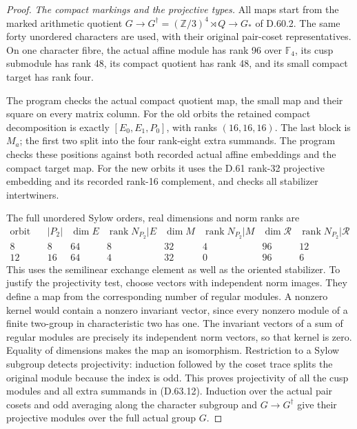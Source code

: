 \begin{proof}
\emph{The compact markings and the projective types.}
All maps start from the marked arithmetic quotient
\(G\to G^\dagger=(\mathbb Z/3)^4\rtimes Q\to G_*\)
of D.60.2. The same forty unordered characters are
used, with their original pair-coset representatives.
On one character fibre, the actual affine module has
rank 96 over \(\mathbb F_4\), its cusp submodule has
rank 48, its compact quotient has rank 48, and its
small compact target has rank four.

The program  checks
the actual compact quotient map, the small map and
their square on every matrix column. For the old
orbits the retained compact decomposition is exactly
\([E_0,E_1,P_0]\), with ranks \((16,16,16)\).
The last block is \(M_a\); the first two split into
the four rank-eight extra summands. The program
checks these positions against both recorded actual
affine embeddings and the compact target map.
For the new orbits it uses the D.61 rank-32
projective embedding and its recorded rank-16
complement, and checks all stabilizer intertwiners.

The full unordered Sylow orders, real dimensions
and norm ranks are
\[
 \begin{array}{c|r|r|r|r|r|r|r}
 \text{orbit size}&|P_2|&\dim E&\operatorname{rank}N_{P_2}|E
   &\dim M&\operatorname{rank}N_{P_2}|M
   &\dim\mathcal R&\operatorname{rank}N_{P_2}|\mathcal R\\\hline
 8&8&64&8&32&4&96&12\\
 12&16&64&4&32&0&96&6
 \end{array}
 \tag{D.63.12}
\]
This uses the semilinear exchange element as well as
the oriented stabilizer. To justify the projectivity
test, choose vectors with independent norm images.
They define a map from the corresponding number of
regular modules. A nonzero kernel would contain a
nonzero invariant vector, since every nonzero module
of a finite two-group in characteristic two has one.
The invariant vectors of a sum of regular modules
are precisely its independent norm vectors, so that
kernel is zero. Equality of dimensions makes the
map an isomorphism. Restriction to a Sylow subgroup
detects projectivity: induction followed by the
coset trace splits the original module because the
index is odd. This proves projectivity of all the
cusp modules and all extra summands in (D.63.12).
Induction over the actual pair cosets and odd
averaging along the character subgroup and
\(G\to G^\dagger\) give their projective modules
over the full actual group \(G\).


\end{proof}
